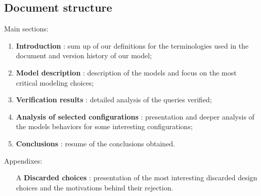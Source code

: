 \documentclass[
10pt, %
a4paper, %
oneside, %
headinclude,footinclude, %
BCOR5mm, %
]{scrartcl}
\begin{document}
		\subsection{Document structure}
			Main sections:
			\begin{enumerate}
				\item \textbf{Introduction} : sum up of our definitions for the terminologies used in the document and version history of our model;
				\item \textbf{Model description} : description of the models and focus on the most critical modeling choices;
				\item \textbf{Verification results} : detailed analysis of the queries verified;
				\item \textbf{Analysis of selected configurations} : presentation and deeper analysis of the models behaviors for some interesting configurations;
				\item \textbf{Conclusions} : resume of the conclusions obtained.
			\end{enumerate}
			Appendixes:
			\begin{enumerate}
				\item[A] \textbf{Discarded choices} : presentation of the most interesting discarded design choices and the motivations behind their rejection.
			\end{enumerate}
\end{document}
